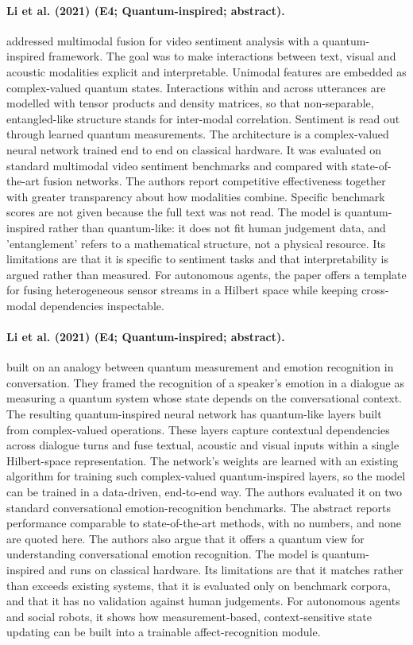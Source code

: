\documentclass[10pt,a4paper]{article}
\begin{document}
\paragraph{Li et al. (2021) (E4; Quantum-inspired; abstract).} \citet{Li2021a} addressed multimodal fusion for video sentiment analysis with a quantum-inspired framework. The goal was to make interactions between text, visual and acoustic modalities explicit and interpretable. Unimodal features are embedded as complex-valued quantum states. Interactions within and across utterances are modelled with tensor products and density matrices, so that non-separable, entangled-like structure stands for inter-modal correlation. Sentiment is read out through learned quantum measurements. The architecture is a complex-valued neural network trained end to end on classical hardware. It was evaluated on standard multimodal video sentiment benchmarks and compared with state-of-the-art fusion networks. The authors report competitive effectiveness together with greater transparency about how modalities combine. Specific benchmark scores are not given because the full text was not read. The model is quantum-inspired rather than quantum-like: it does not fit human judgement data, and 'entanglement' refers to a mathematical structure, not a physical resource. Its limitations are that it is specific to sentiment tasks and that interpretability is argued rather than measured. For autonomous agents, the paper offers a template for fusing heterogeneous sensor streams in a Hilbert space while keeping cross-modal dependencies inspectable.

\paragraph{Li et al. (2021) (E4; Quantum-inspired; abstract).} \citet{Li2021b} built on an analogy between quantum measurement and emotion recognition in conversation. They framed the recognition of a speaker's emotion in a dialogue as measuring a quantum system whose state depends on the conversational context. The resulting quantum-inspired neural network has quantum-like layers built from complex-valued operations. These layers capture contextual dependencies across dialogue turns and fuse textual, acoustic and visual inputs within a single Hilbert-space representation. The network's weights are learned with an existing algorithm for training such complex-valued quantum-inspired layers, so the model can be trained in a data-driven, end-to-end way. The authors evaluated it on two standard conversational emotion-recognition benchmarks. The abstract reports performance comparable to state-of-the-art methods, with no numbers, and none are quoted here. The authors also argue that it offers a quantum view for understanding conversational emotion recognition. The model is quantum-inspired and runs on classical hardware. Its limitations are that it matches rather than exceeds existing systems, that it is evaluated only on benchmark corpora, and that it has no validation against human judgements. For autonomous agents and social robots, it shows how measurement-based, context-sensitive state updating can be built into a trainable affect-recognition module.
\end{document}
